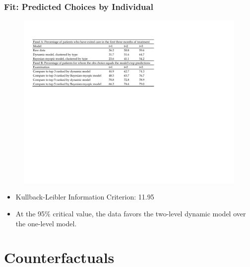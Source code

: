 \documentclass[xcolor=pdftex,dvipsnames,table,mathserif,aspectratio=169]{beamer}
\begin{document}

\begin{frame}
\frametitle{Fit: Predicted Choices by Individual}

\begin{figure}[h!]
\centering\includegraphics[width=1\linewidth]{./resources/fit_table.pdf}
\end{figure}

\begin{itemize}
\item Kullback-Leibler Information Criterion: 11.95

\item At the 95\% critical value, the data favors the two-level dynamic
model over the one-level model.
\end{itemize}
\end{frame}

\section{Counterfactuals}

\end{document}
